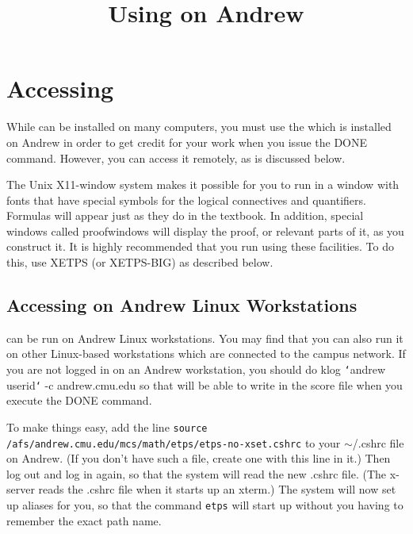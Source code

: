 \documentclass{article}
\begin{document}
\title{Using {\ETPS} on Andrew}
\date{}				%
\maketitle


\section{Accessing {\ETPS}}

While {\ETPS} can be installed on many computers, you must use the
{\ETPS} which is installed on Andrew in order to get credit for your work
when you issue the DONE command. However, you can access it remotely,
as is discussed below.

The Unix X11-window system makes it possible for you to run {\ETPS} in a
window with fonts that have special symbols for the logical
connectives and quantifiers. Formulas will appear just as they do in
the textbook. In addition, special windows called proofwindows
will display the proof, or relevant parts of it, as you construct it.
It is highly recommended that you run {\ETPS} using these facilities.
To do this, use XETPS (or XETPS-BIG) as described below.

\subsection{Accessing {\ETPS} on Andrew Linux Workstations}

{\ETPS} can be run on Andrew Linux workstations.
You may  find that you can also run it on other Linux-based
workstations which are connected to the campus network.
If you are not logged in on an Andrew workstation, you should do\newline{}
klog {\tt\char`\<}andrew userid{\tt\char`\>} -c andrew.cmu.edu\newline{}
so that {\ETPS} will be able to write in the score file when you
execute the DONE command.

To make things easy, add the line\newline{}
{\tt source /afs/andrew.cmu.edu/mcs/math/etps/etps-no-xset.cshrc}\newline{}
to your $\sim$/.cshrc file on Andrew. (If you don't have such a file, create one
with this line in it.)
Then log out and log in again, so
that the system will read the new .cshrc file.
(The x-server reads the .cshrc file when it starts up an xterm.)
The system will now set up aliases for you, so that the command\newline{}
{\tt etps}\newline{}
will start up {\ETPS} without you having to remember the exact path name.
\end{document}
